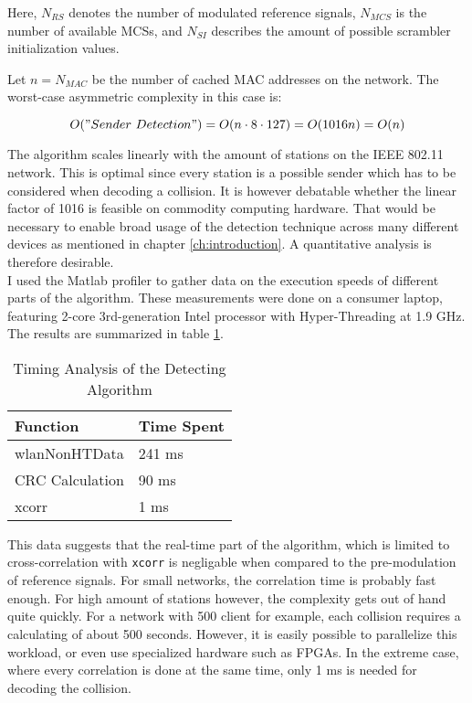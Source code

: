 Here, $ N_{RS} $ denotes the number of modulated reference signals, $ N_{MCS} $ is the number of available \glspl{MCS}, and $ N_{SI} $ describes the amount of possible scrambler initialization values.

Let $ n = N_{MAC} $ be the number of cached MAC addresses on the network. The worst-case asymmetric complexity in this case is:

$$ O("Sender ~Detection") = O(n \cdot 8 \cdot 127) = O(1016 n) = O(n) $$\vspace{0cm}

The algorithm scales linearly with the amount of stations on the IEEE 802.11 network. This is optimal since every station is a possible sender which has to be considered when decoding a collision. It is however debatable whether the linear factor of 1016 is feasible on commodity computing hardware. That would be necessary to enable broad usage of the detection technique across many different devices as mentioned in chapter \ref{ch:introduction}. A quantitative analysis is therefore desirable.\\

I used the Matlab profiler to gather data on the execution speeds of different parts of the algorithm. These measurements were done on a consumer laptop, featuring 2-core 3rd-generation Intel processor with Hyper-Threading at 1.9 GHz. The results are summarized in table \ref{tbl:timing}.

\begin{table}[ht]
	\centering
	\begin{tabular}{|p{8.5cm}|p{2.5cm}|}
		\hline
		\textbf{Function} & \textbf{Time Spent} \\ \hline
    wlanNonHTData & 241 ms \\ \hline
    CRC Calculation & 90 ms \\ \hline
		xcorr & 1 ms \\ \hline
	\end{tabular}
	\caption{Timing Analysis of the Detecting Algorithm \label{tbl:timing}}
\end{table}

This data suggests that the real-time part of the algorithm, which is limited to cross-correlation with \texttt{xcorr} is negligable when compared to the pre-modulation of reference signals. For small networks, the correlation time is probably fast enough. For high amount of stations however, the complexity gets out of hand quite quickly. For a network with 500 client for example, each collision requires a calculating of about 500 seconds. However, it is easily possible to parallelize this workload, or even use specialized hardware such as \glspl{FPGA}. In the extreme case, where every correlation is done at the same time, only 1 ms is needed for decoding the collision.

